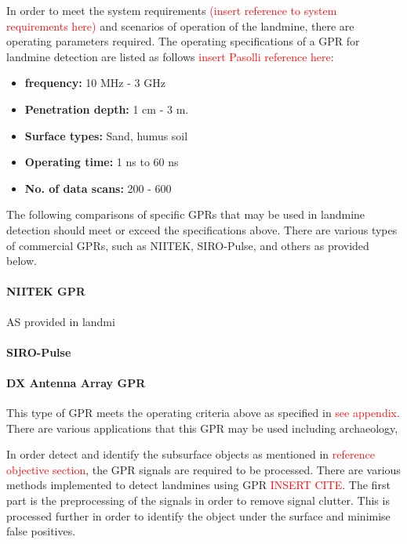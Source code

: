 \documentclass[main.tex]{subfiles}
\begin{document}
In order to meet the system requirements \textcolor{red}{(insert reference to system requirements here)} and  scenarios of operation of the landmine, there are operating parameters required. The operating specifications of a GPR for landmine detection are listed as follows \textcolor{red}{insert Pasolli reference here}:
\begin{itemize}
\item{\textbf{frequency:} 10 MHz - 3 GHz}
\item{\textbf{Penetration depth:} 1 cm - 3 m.}
\item{\textbf{Surface types:} Sand, humus soil}
\item{\textbf{Operating time:} 1 ns to 60 ns}
\item{\textbf{No. of data scans:} 200 - 600}
\end{itemize}

The following comparisons of specific GPRs that may be used in landmine detection should meet or exceed the specifications above. There are various types of commercial GPRs, such as NIITEK, SIRO-Pulse, and others as provided below. %

\paragraph{NIITEK GPR}
AS provided in landmi
\paragraph{SIRO-Pulse}

\paragraph{DX Antenna Array GPR} This type of GPR meets the operating criteria above as specified in \textcolor{red}{see appendix}. There are various applications that this GPR may be used including archaeology,


In order detect and identify the subsurface objects as mentioned in \textcolor{red}{reference objective section}, the GPR signals are required to be processed. There are various methods implemented to detect landmines using GPR \textcolor{red}{INSERT CITE}. The first part is the preprocessing of the signals in order to remove signal clutter. This is processed further in order to identify the object under the surface and minimise false positives.
\end{document}

